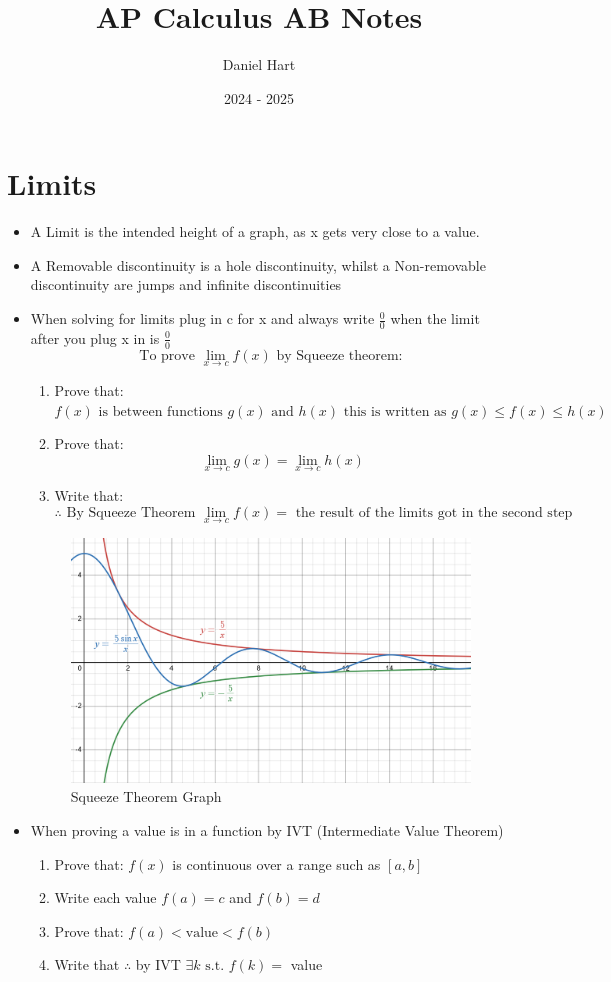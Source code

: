 \documentclass{article}
\title{AP Calculus AB Notes}
\author{Daniel Hart}
\date{2024 - 2025}
\begin{document}
\maketitle

\section{Limits}
\begin{itemize}
    \item A Limit is the intended height of a graph, as x gets very close to a value.
    \item A Removable discontinuity is a hole discontinuity, whilst a Non-removable discontinuity are jumps and infinite discontinuities
    \item When solving for limits plug in c for x and always write $\frac{0}{0}$ when the limit after you plug x in is $\frac{0}{0}$
    \[\text{To prove }\lim_{x\to c}f(x)\text{ by Squeeze theorem:}\]
    \begin{enumerate}
        \item Prove that:
            $f(x)\text{ is between functions }g(x)\text{ and }h(x)\text{ this is written as }g(x) \leq f(x) \leq h(x)$
        \item Prove that: \[
            \lim_{x\to c}g(x) = \lim_{x\to c}h(x)
        \]
        \item Write that: \[\therefore\text{ By Squeeze Theorem } \lim_{x\to c}f(x) =\text{ the result of the limits got in the second step}\]
    \end{enumerate}
    
    \begin{figure}[H]
        \centering
        \includegraphics[width=0.5\linewidth]{images/Squeeze Theorem Graph.png}
        \caption{Squeeze Theorem Graph}
    \end{figure}
    
    \item When proving a value is in a function by IVT (Intermediate Value Theorem)
    \begin{enumerate}
        \item Prove that: $f(x)$ is continuous over a range such as $[a,b]$
        \item Write each value $f(a)=c$ and $f(b)=d$
        \item Prove that: $f(a) < \text{value} < f(b)$
        \item Write that $\therefore$ by IVT $\exists k \text{ s.t. } f(k) =$ value
    \end{enumerate}
\end{itemize}
\end{document}
